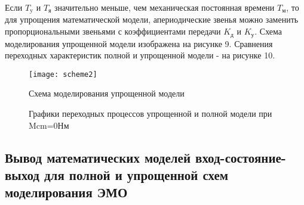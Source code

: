 \documentclass[a4paper, 12pt]{article}
\begin{document}
Если $T_\text{y}$ и $T_\text{я}$ значительно меньше, чем механическая постоянная времени $T_\text{м}$, то для упрощения математической модели, апериодические звенья можно заменить пропорциональными звеньями с коэффициентами передачи $K_\text{д}$ и $K_\text{у}$. Схема моделирования упрощенной модели изображена на рисунке 9. Сравнения переходных характеристик полной и упрощенной модели - на рисунке 10.
\begin{figure}[h]
\begin{center}
\texttt{[image: scheme2]}
\caption{Схема моделирования упрощенной модели}
\end{center}  
\end{figure}

\begin{figure}[h]
\begin{minipage}[h]{0.49\linewidth}
\centering{\texttt{[image: w7]} \\ $\omega$}
\end{minipage}
\hfill
\begin{minipage}[h]{0.49\linewidth}
\end{minipage}
\caption{Графики переходных процессов упрощенной и полной модели при Mcm=0Нм}
\end{figure}\par
\newpage

\begin{center}
	\section{Вывод математических моделей вход-состояние-выход для полной и упрощенной схем моделирования ЭМО}
\end{center}\hfill
\end{document}
